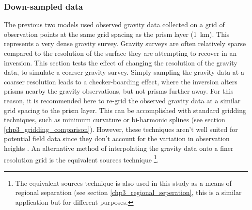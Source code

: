 \subsubsection{Down-sampled data} \label{chp3:eq source resampled}
The previous two models used observed gravity data collected on a grid of observation points at the same grid spacing as the prism layer (1~km). This represents a very dense gravity survey. Gravity surveys are often relatively sparse compared to the resolution of the surface they are attempting to recover in an inversion. This section tests the effect of changing the resolution of the gravity data, to simulate a coarser gravity survey. Simply sampling the gravity data at a coarser resolution leads to a checker-boarding effect, where the inversion alters prisms nearby the gravity observations, but not prisms further away. 
For this reason, it is recommended here to re-grid the observed gravity data at a similar grid spacing to the prism layer. This can be accomplished with standard gridding techniques, such as minimum curvature or bi-harmonic splines (see section \ref{chp3_gridding_comparison}). However, these techniques aren't well suited for potential field data since they don't account for the variation in observation heights \citep{solergradientboosted2021}. An alternative method of interpolating the gravity data onto a finer resolution grid is the equivalent sources technique \citep{dampneyequivalent1969}\footnote{The equivalent sources technique is also used in this study as a means of regional separation (see section \ref{chp3_regional_seperation}, this is a similar application but for different purposes.}. \\

